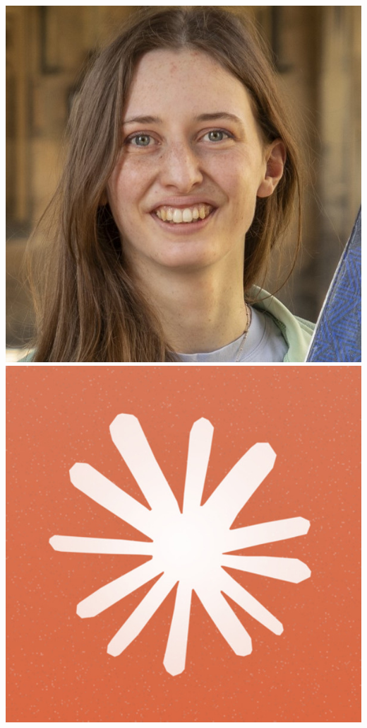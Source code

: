 \documentclass[aspectratio=169]{beamer}
\begin{document}
\begin{frame}
{        \includegraphics[width=0.06\textheight]{people/charlotte_priestley.jpg}%
        \includegraphics[width=0.06\textheight]{people/claude.jpg}%
}
\end{frame}
\end{document}
